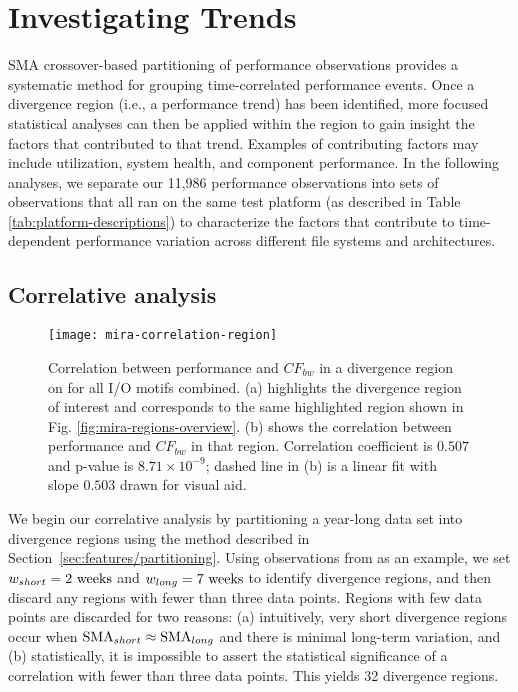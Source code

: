 \section{Investigating Trends}\label{sec:results}

SMA crossover-based partitioning of performance observations provides
a systematic method for grouping time-correlated performance events.
Once a divergence region (i.e., a performance trend) has been identified,
more focused statistical analyses can then be applied within the region
to gain insight the factors that contributed to that trend.  Examples of
contributing factors may include utilization, system health, and component performance.
In the following analyses, we separate our 11,986 performance observations into sets of observations that all ran on the same test platform (as described in Table \ref{tab:platform-descriptions}) to characterize the factors that contribute to time-dependent performance variation across different file systems and architectures.

\subsection{Correlative analysis} \label{sec:results/correlate-mira}

\begin{figure}
    \centering
    \texttt{[image: mira-correlation-region]}
    \vspace{-.35in}
    \caption{Correlation between performance and $CF_{bw}$ in a divergence region on \mira for all I/O motifs combined.
    (a) highlights the divergence region of interest and corresponds to the same highlighted region shown in Fig. \ref{fig:mira-regions-overview}. (b) shows the correlation between performance and $CF_{bw}$ in that region.
    Correlation coefficient is $0.507$ and p-value is ${8.71 \times 10^{-9}}$; dashed line in (b) is a linear fit with slope $0.503$ drawn for visual aid.}
    \label{fig:mira-correlation-region}
\end{figure}


We begin our correlative analysis by partitioning a year-long data set into
divergence regions using the method described in
Section~\ref{sec:features/partitioning}.  Using observations from \mira
\mirafsone as an example, we set $w_{short} = 2 \textup{ weeks}$ and $w_{long}
= 7 \textup{ weeks}$ to identify divergence regions, and then discard any
regions with fewer than three data points.  Regions with few data points are discarded
for two reasons: (a) intuitively, very short divergence regions occur
when $\textup{SMA}_{short} \approx \textup{SMA}_{long}$ and there is
minimal long-term variation, and (b) statistically, it is impossible
to assert the statistical significance of a correlation with fewer than
three data points.  This yields 32 divergence regions.

